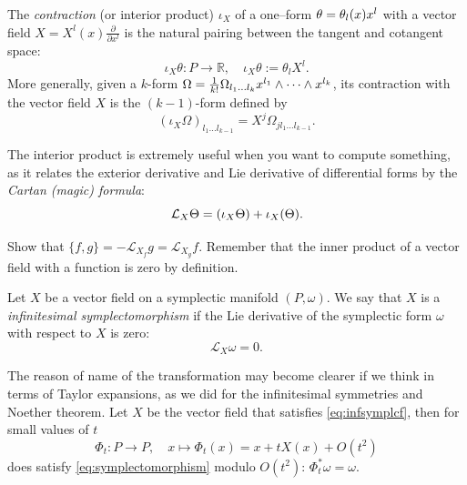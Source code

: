 \documentclass[english,fontsize=11pt,paper=a5,oneside]{scrbook}
\newcommand{\cL}{\mathcal{L}}
\newcommand{\R}{\mathbb{R}}
\let\d\relax
\newcommand{\d}{\mathrm{d}}
\theoremstyle{definition}
\newenvironment{exercise}
  {\pushQED{\qed}\renewcommand{\qedsymbol}{$\maltese$}\exercisex}
  {\popQED\endexercisex}
\begin{document}
The \emph{contraction} (or interior product) $\iota_X$ of a one--form $\theta = \theta_l(x)\d x^l$ with a vector field $X = X^l(x)\frac{\partial}{\partial x^l}$ is the natural pairing between the tangent and cotangent space:
\begin{equation}
  \iota_X \theta : P \to \R, \quad \iota_X \theta := \theta_l X^l.
\end{equation}
More generally, given a $k$-form $\Omega = \frac1{k!}\Omega_{l_1\ldots l_k} \d x^{l_1}\wedge\cdots\wedge\d x^{l_k}$, its contraction with the vector field $X$ is the $(k-1)$-form defined by
\begin{equation}\label{eq:contraction}
  (\iota_X\Omega)_{l_1\ldots l_{k-1}} = X^j \Omega_{jl_1\ldots l_{k-1}}.
\end{equation}

The interior product is extremely useful when you want to compute something, as it relates the exterior derivative and Lie derivative of differential forms by the \emph{Cartan (magic) formula}:
\begin{equation}\label{eq:cartan}
  \cL_X \Theta = \d(\iota_X \Theta) + \iota_X (\d\Theta).
\end{equation}

\begin{exercise}
  Show that $\big\{f,g\big\} = -\cL_{X_f} g = \cL_{X_g} f$.
  Remember that the inner product of a vector field with a function is zero by definition.
\end{exercise}

\begin{tcolorbox}
  Let $X$ be a vector field on a symplectic manifold $(P,\omega)$.
  We say that $X$ is a \emph{infinitesimal symplectomorphism} if the Lie derivative of the symplectic form $\omega$ with respect to $X$ is zero:
  \begin{equation}\label{eq:infsymplcf}
    \cL_X \omega = 0.
  \end{equation}
\end{tcolorbox}

The reason of name of the transformation may become clearer if we think in terms of Taylor expansions, as we did for the infinitesimal symmetries and Noether theorem.
Let $X$ be the vector field that satisfies \eqref{eq:infsymplcf}, then for small values of $t$
\begin{equation}
  \Phi_t:P \to P, \quad x \mapsto \Phi_t(x) = x + t X(x) + O(t^2)
\end{equation}
does satisfy \eqref{eq:symplectomorphism} modulo $O(t^2)$: $\Phi_t^* \omega = \omega$.
\end{document}
